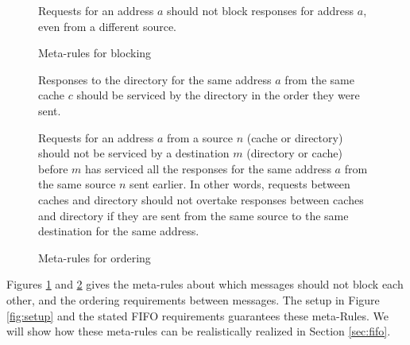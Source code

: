 
\begin{figure}
\begin{cons}
Requests for an address $a$ should not block responses for address $a$, even
from a different source.
\end{cons}
\caption{Meta-rules for blocking}
\label{block}
\end{figure}
\begin{figure}
\begin{cons}
Responses to the directory for the same address $a$ from the same cache $c$
should be serviced by the directory in the order they were sent.
\end{cons}
\begin{cons}
Requests for an address $a$ from a source $n$ (cache or directory) should not be
serviced by a destination $m$ (directory or cache) before $m$ has serviced all the
responses for the same address $a$ from the same source $n$ sent earlier. In
other words, requests between caches and directory should not overtake responses
between caches and directory if they are sent from the same source to the same
destination for the same address.
\end{cons}
\caption{Meta-rules for ordering}
\label{order}
\end{figure}

Figures \ref{block} and \ref{order} gives the meta-rules about which messages
should not block each other, and the ordering requirements between messages. The
setup in Figure \ref{fig:setup} and the stated FIFO requirements guarantees
these meta-Rules. We will show how these meta-rules can be realistically
realized in Section \ref{sec:fifo}.

